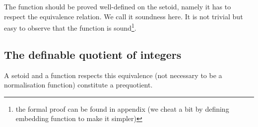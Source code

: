 \begin{code}
\\
\>\AgdaFunction{[\_]} \<[18]%
\>[18]\AgdaSymbol{:}   \<%
\\
\>\AgdaFunction{[}  \AgdaInductiveConstructor{,}  \AgdaFunction{]} \<[18]%
\>[18]\AgdaSymbol{=} \AgdaInductiveConstructor{+} \<%
\\
\>\AgdaFunction{[}  \AgdaInductiveConstructor{,}   \AgdaFunction{]} \<[18]%
\>[18]\AgdaSymbol{=}  \<%
\\
\>\AgdaFunction{[}   \AgdaInductiveConstructor{,}   \AgdaFunction{]} \AgdaSymbol{=} \AgdaFunction{[}  \AgdaInductiveConstructor{,}  \AgdaFunction{]}\<%
\\
\end{code}

The function should be proved well-defined on the setoid, namely it
has to respect the equivalence relation. We call it soundness here. 
It is not trivial but easy to observe that the function is
sound\footnote{the formal proof can be found in appendix (we cheat a
  bit by defining embedding function to make it simpler)}.

\subsection{The definable quotient of integers}

A setoid and a function respects this equivalence (not necessary to be
a normalisation function) constitute a prequotient.

